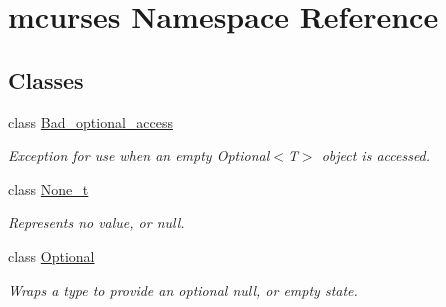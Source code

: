 \hypertarget{namespacemcurses}{}\section{mcurses Namespace Reference}
\label{namespacemcurses}
\subsection*{Classes}
\begin{DoxyCompactItemize}
\item 
class \hyperlink{classmcurses_1_1Bad__optional__access}{Bad\+\_\+optional\+\_\+access}
\begin{DoxyCompactList}\small\item\em Exception for use when an empty Optional$<$\+T$>$ object is accessed. \end{DoxyCompactList}\item 
class \hyperlink{classmcurses_1_1None__t}{None\+\_\+t}
\begin{DoxyCompactList}\small\item\em Represents \textquotesingle{}no value\textquotesingle{}, or null. \end{DoxyCompactList}\item 
class \hyperlink{classmcurses_1_1Optional}{Optional}
\begin{DoxyCompactList}\small\item\em Wraps a type to provide an optional \textquotesingle{}null\textquotesingle{}, or empty state. \end{DoxyCompactList}\end{DoxyCompactItemize}

